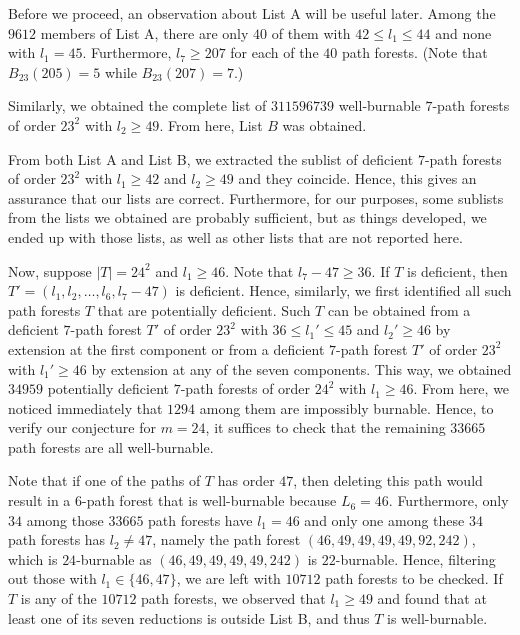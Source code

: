 \documentclass[
final
]{dmtcs-episciences}
\theoremstyle{definition}
\theoremstyle{remark}
\begin{document}
Before we proceed, an observation about List A will be useful later. Among the $9612$ members of List A, there are only $40$ of them with $42\leq l_1\leq 44$ and none with $l_1=45$. Furthermore, $l_7\geq 207$ for each of the $40$ path forests. (Note that $B_{23}(205)=5$ while $B_{23}(207)=7$.)

Similarly, we obtained the complete list of $311596739$ well-burnable $7$-path forests of order $23^2$ with $l_2\geq 49$. From here, List $B$ was obtained.

From both List A and List B, we extracted the sublist of deficient $7$-path forests of order $23^2$ with $l_1\geq 42$ and $l_2\geq 49$ and they coincide. Hence, this gives an assurance that our lists are correct. Furthermore, for our purposes, some sublists from the lists we obtained are probably sufficient, but as things developed, we ended up with those lists, as well as other lists that are not reported here.


Now, suppose $\vert T\vert =24^2$ and $l_1\geq 46$. Note that $l_7-47\geq 36$. If $T$ is deficient, then $T'=(l_1, l_2, \ldots, l_6, l_7-47)$ is deficient. 
Hence, similarly, we first identified all such path forests $T$ that are potentially deficient.
Such $T$ can be obtained from a deficient $7$-path forest $T'$ of order $23^2$ with $36\leq l_
1'\leq 45$ and $l_2'\geq 46$ by extension at the first component or from a deficient $7$-path forest $T'$ of order $23^2$ with $l_1'\geq 46$ by extension at any of the seven components.  
This way, we obtained $34959$ potentially deficient $7$-path forests of order $24^2$ with $l_1\geq 46$.
From here, we noticed immediately that $1294$ among them are impossibly burnable. Hence, 
to verify our conjecture for $m=24$, it suffices to check that the remaining $33665$ path forests are all well-burnable. 


Note that if one of the paths of $T$ has order $47$, then deleting this path would result in a $6$-path forest that is well-burnable because $L_6=46$. Furthermore, only $34$ among those $33665$ path forests have $l_1=46$ and only one among these $34$ path forests has $l_2\neq47$, namely the path forest $(46,49,49,49,49, 92,242)$, which is \mbox{$24$-burnable} as $(46,49,49,49,49,242)$ is $22$-burnable.
Hence, filtering out those with $l_1\in \{46,47\}$, we are left with $10712$ path forests to be checked. 
If $T$ is any of the $10712$ path forests,  we observed that $l_1\geq 49$ and  found that at least one of its seven reductions is outside List B, and thus $T$ is well-burnable.
\end{document}
